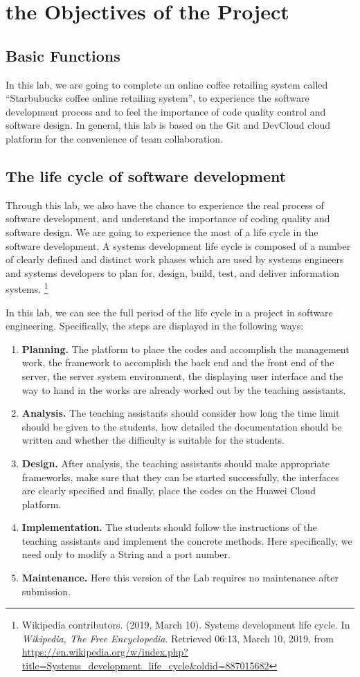 \documentclass[./report.tex]{subfiles}
\begin{document}
\section{the Objectives of the Project}
\subsection{Basic Functions}
In this lab, we are going to complete an online coffee retailing system called ``Starbubucks coffee online retailing system'', to experience the software development process and to feel the importance of code quality control and software design. In general, this lab is based on the Git and DevCloud cloud platform for the convenience of team collaboration.
\subsection{The life cycle of software development}
Through this lab, we also have the chance to experience the real process of software development, and understand the importance of coding quality and software design. We are going to experience the most of a life cycle in the software development. A systems development life cycle is composed of a number of clearly defined and distinct work phases which are used by systems engineers and systems developers to plan for, design, build, test, and deliver information systems. \footnote{Wikipedia contributors. (2019, March 10). Systems development life cycle. In \emph{Wikipedia, The Free Encyclopedia}. Retrieved 06:13, March 10, 2019, from \url{https://en.wikipedia.org/w/index.php?title=Systems_development_life_cycle&oldid=887015682}} 
\par
In this lab, we can see the full period of the life cycle in a project in software engineering. Specifically, the steps are displayed in the following ways:
\begin{enumerate}
  \item \textbf{Planning.} The platform to place the codes and accomplish the management work, the framework to accomplish the back end and the front end of the server, the server system environment, the displaying user interface and the way to hand in the works are already worked out by the teaching assistants.
  \item \textbf{Analysis.} The teaching assistants should consider how long the time limit should be given to the students, how detailed the documentation should be written and whether the difficulty is suitable for the students.
  \item \textbf{Design.} After analysis, the teaching assistants should make appropriate frameworks, make sure that they can be started successfully, the interfaces are clearly specified and finally, place the codes on the Huawei Cloud platform.
  \item \textbf{Implementation.} The students should follow the instructions of the teaching assistants and implement the concrete methods. Here specifically, we need only to modify a String and a port number.
  \item \textbf{Maintenance.} Here this version of the Lab requires no maintenance after submission.
\end{enumerate}
\end{document}
